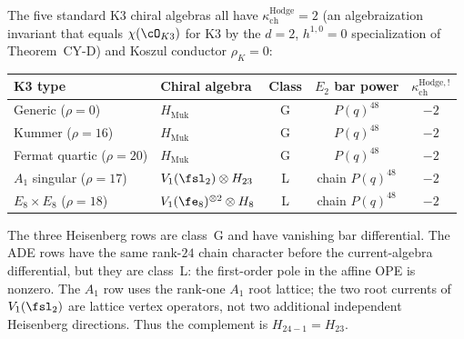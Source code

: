 \begin{proposition}
\label{prop:e2-koszul-k3-landscape}
The five standard K3 chiral algebras all have
$\kappa_{\mathrm{ch}}^{\mathrm{Hodge}} = 2$ (an algebraization invariant that
equals $\chi(\cO_{K3})$ for K3 by the $d=2$, $h^{1,0}=0$
specialization of Theorem~CY-D) and Koszul conductor
$\rho_K = 0$:
\begin{center}
\begin{tabular}{llccc}
\toprule
\textbf{K3 type} & \textbf{Chiral algebra} & \textbf{Class} &
 $E_2$ \textbf{bar power} & $\kappa_{\mathrm{ch}}^{\mathrm{Hodge},!}$ \\
\midrule
Generic ($\rho = 0$) & $H_{\mathrm{Muk}}$ & G & $P(q)^{48}$ & $-2$ \\
Kummer ($\rho = 16$) & $H_{\mathrm{Muk}}$ & G & $P(q)^{48}$ & $-2$ \\
Fermat quartic ($\rho = 20$) & $H_{\mathrm{Muk}}$ & G & $P(q)^{48}$ & $-2$ \\
$A_1$ singular ($\rho = 17$) & $V_1(\fsl_2) \otimes H_{23}$ & L & chain $P(q)^{48}$ & $-2$ \\
$E_8 \times E_8$ ($\rho = 18$) & $V_1(\fe_8)^{\otimes 2} \otimes H_8$ & L & chain $P(q)^{48}$ & $-2$ \\
\bottomrule
\end{tabular}
\end{center}
The three Heisenberg rows are class~G and have vanishing bar
differential. The ADE rows have the same rank-$24$ chain character before
the current-algebra differential, but they are class~L: the first-order
pole in the affine OPE is nonzero. The $A_1$ row uses the rank-one
$A_1$ root lattice; the two root currents of $V_1(\fsl_2)$ are lattice
vertex operators, not two additional independent Heisenberg directions.
Thus the complement is $H_{24-1}=H_{23}$.
\end{proposition}


